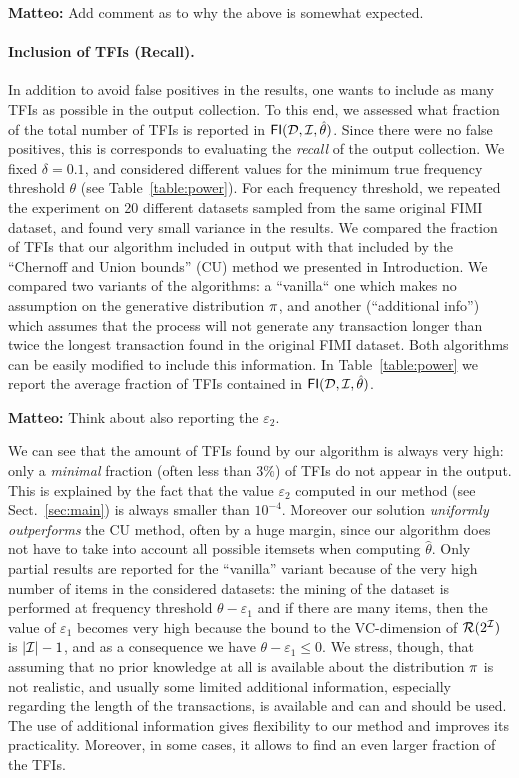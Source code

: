 {\bf Matteo: } Add comment as to why the above is somewhat expected.

\paragraph*{Inclusion of TFIs (Recall).}
In addition to avoid false positives in the results, one wants to include as many TFIs
as possible in the output collection. To this end, we assessed what fraction of
the total number of TFIs is reported in $\mathsf{FI}({\cal D},{\cal I},\hat\theta)$. Since there
were no false positives, this is corresponds to evaluating the \emph{recall} of
the output collection. We fixed $\delta=0.1$, and considered different values
for the minimum true frequency threshold $\theta$ (see Table~\ref{table:power}).
For each frequency threshold, we repeated the experiment on 20 different
datasets sampled from the same original FIMI dataset, and found very small
variance in the results. We compared the fraction of TFIs that our algorithm
included in output with that included by the ``Chernoff and Union bounds'' (CU)
method we presented in Introduction. We compared two variants of the algorithms:
a ``vanilla`` one which makes no assumption on the generative distribution $\pi$,
and another (``additional info'') which assumes that the process will not
generate any transaction longer than twice the longest transaction found in the
original FIMI dataset. Both algorithms can be easily modified to include this
information. In Table~\ref{table:power} we report the average fraction of TFIs
contained in $\mathsf{FI}({\cal D},{\cal I},\hat\theta)$.

{\bf Matteo: } Think about also reporting the $\varepsilon_2$.

We can see that the amount of TFIs found by our algorithm is always very high:
only a \emph{minimal} fraction (often less than $3\%$) of TFIs do not appear in
the output. This is explained by the fact that the value $\varepsilon_2$
computed in our method (see Sect.~\ref{sec:main}) is always smaller than
$10^{-4}$. Moreover our solution \emph{uniformly outperforms} the CU method,
often by a huge margin, since our algorithm does not have to take into account
all possible itemsets when computing $\hat\theta$. Only partial results are
reported for the ``vanilla'' variant because of the very high number of items in
the considered datasets: the mining of the dataset is performed at frequency
threshold $\theta-\varepsilon_1$  and if there are many items, then the value of
$\varepsilon_1$ becomes very high because the bound to the VC-dimension of
$\mathcal{R}(2^{\cal I})$ is $|{\cal I}|-1$, and as a consequence we have
$\theta-\varepsilon_1\le 0$. We stress, though, that assuming that no prior
knowledge at all is available about the distribution $\pi$ is not realistic,
and usually some limited additional information, especially regarding the length
of the transactions, is available and can and should be used. The use of
additional information gives flexibility to our method and improves its
practicality. Moreover, in some cases, it allows to find an even larger fraction
of the TFIs.


